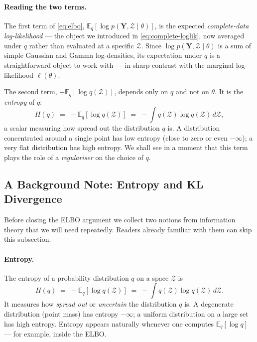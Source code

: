 \documentclass[11pt, a4paper, oneside]{article}
\newcommand{\mY}{\mathbf{Y}}
\begin{document}
\paragraph{Reading the two terms.}
The first term of \eqref{eq:elbo},
$\mathbb{E}_q[\log p(\mY, \mathcal{Z} \mid \theta)]$, is the expected
\emph{complete-data log-likelihood} — the object we introduced in
\eqref{eq:complete-loglik}, now averaged under $q$ rather than evaluated
at a specific $\mathcal{Z}$. Since $\log p(\mY, \mathcal{Z} \mid \theta)$
is a sum of simple Gaussian and Gamma log-densities, its expectation
under $q$ is a straightforward object to work with — in sharp contrast
with the marginal log-likelihood $\ell(\theta)$.

The second term, $-\mathbb{E}_q[\log q(\mathcal{Z})]$, depends only on
$q$ and not on $\theta$. It is the \emph{entropy} of $q$:
\[
H(q) \;=\; -\mathbb{E}_q[\log q(\mathcal{Z})] \;=\;
-\int q(\mathcal{Z}) \log q(\mathcal{Z})\, d\mathcal{Z},
\]
a scalar measuring how spread out the distribution $q$ is. A distribution
concentrated around a single point has low entropy (close to zero or
even $-\infty$); a very flat distribution has high entropy. We shall see
in a moment that this term plays the role of a \emph{regulariser} on the
choice of $q$.

\subsection{A Background Note: Entropy and KL Divergence}

Before closing the ELBO argument we collect two notions from information
theory that we will need repeatedly. Readers already familiar with them
can skip this subsection.

\paragraph{Entropy.}
The entropy of a probability distribution $q$ on a space $\mathcal{Z}$ is
\[
H(q) \;=\; -\mathbb{E}_q[\log q(\mathcal{Z})]
\;=\; -\int q(\mathcal{Z}) \log q(\mathcal{Z})\, d\mathcal{Z}.
\]
It measures how \emph{spread out} or \emph{uncertain} the distribution
$q$ is. A degenerate distribution (point mass) has entropy $-\infty$; a
uniform distribution on a large set has high entropy. Entropy appears
naturally whenever one computes $\mathbb{E}_q[\log q]$ — for example,
inside the ELBO.
\end{document}
